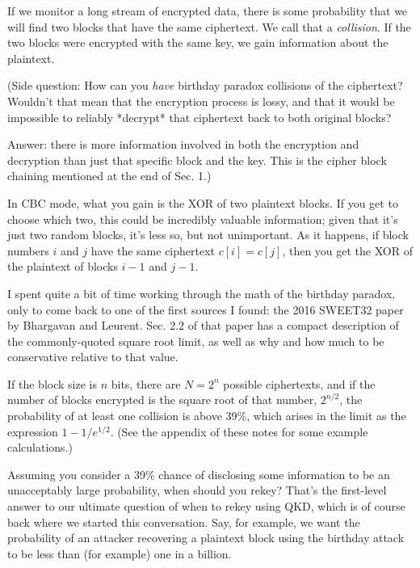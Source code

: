 If we monitor a long stream of encrypted data, there is some
probability that we will find two blocks that have the same
ciphertext.  We call that a \emph{collision}.  If the two blocks were
encrypted with the same key, we gain information about the plaintext.

(Side question: How can you \emph{have} birthday paradox collisions of the
ciphertext?  Wouldn't that mean that the encryption process is lossy,
and that it would be impossible to reliably *decrypt* that ciphertext
back to both original blocks?

Answer: there is more information involved in both the encryption and
decryption than just that specific block and the key.  This is the
cipher block chaining mentioned at the end of Sec. 1.)

In CBC mode, what you gain is the XOR of two plaintext blocks.  If you
get to choose which two, this could be incredibly valuable
information; given that it's just two random blocks, it's less so, but
not unimportant.  As it happens, if block numbers $i$ and $j$ have the
same ciphertext $c[i] = c[j]$, then you get the XOR of the plaintext of
blocks $i-1$ and $j-1$.  

I spent quite a bit of time working through the math of the birthday
paradox, only to come back to one of the first sources I found: the
2016 SWEET32 paper by Bhargavan and Leurent.  Sec. 2.2 of that paper
has a compact description of the commonly-quoted square root limit, as
well as why and how much to be conservative relative to that value.

If the block size is $n$ bits, there are $N = 2^n$ possible
ciphertexts, and if the number of blocks encrypted is the square root
of that number, $2^{n/2}$, the probability of at least one collision
is above 39\%, which arises in the limit as the expression
$1-1/e^{1/2}$.  (See the appendix of these notes for some example
calculations.)

Assuming you consider a 39\% chance of disclosing some information to
be an unacceptably large probability, when should you rekey?  That's
the first-level answer to our ultimate question of when to rekey using
QKD, which is of course back where we started this conversation.  Say,
for example, we want the probability of an attacker recovering a
plaintext block using the birthday attack to be less than (for
example) one in a billion.

